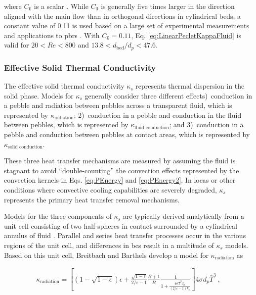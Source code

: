 \noindent where \(C_0\) is a scalar \cite{yagi1957, schertz, tsotsas, yagi,amiri,amiri1995,delgado}. While \(C_0\) is generally five times larger in the direction aligned with the main flow than in orthogonal directions in cylindrical beds, a constant value of 0.11 is used based on a large set of experimental measurements and applications to \glspl{pbr} \cite{yagi1957,auwerda_2011,delgado,amiri1995,yagi,tsotsas}. With \(C_0=0.11\), Eq. \eqref{eq:LinearPecletKappaFluid} is valid for \(20<Re<800\) and \(13.8<d_\text{bed}/d_p<47.6\).

\subsubsection{Effective Solid Thermal Conductivity}
\label{sec:KappaS}

The effective solid thermal conductivity \(\kappa_s\) represents thermal dispersion in the solid phase. Models for \(\kappa_s\) generally consider three different effects)~conduction in a pebble and radiation between pebbles across a transparent fluid, which is represented by \(\kappa_\text{radiation}\); 2)~conduction in a pebble and conduction in the fluid between pebbles, which is represented by \(\kappa_\textrm{fluid conduction}\); and 3)~conduction in a pebble and conduction between pebbles at contact areas, which is represented by \(\kappa_\textrm{solid conduction}\).

These three heat transfer mechanisms are measured by assuming the fluid is stagnant to avoid ``double-counting'' the convection effects represented by the convection kernels in Eqs. \eqref{eq:PEnergy} and \eqref{eq:PEnergy2}. In \glspl{loca} or other conditions where convective cooling capabilities are severely degraded, \(\kappa_s\) represents the primary heat transfer removal mechanisms. 

Models for the three components of \(\kappa_s\) are typically derived analytically from a unit cell consisting of two half-spheres in contact surrounded by a cylindrical annulus of fluid \cite{breitbach}. Parallel and series heat transfer processes occur in the various regions of the unit cell, and differences in \glspl{bc} result in a multitude of \(\kappa_s\) models. Based on this unit cell, Breitbach and Barthels develop a model for \(\kappa_\text{radiation}\) as

\begin{equation}
\begin{aligned}
\label{eq:KappaRadiationBB}
\kappa_\text{radiation}=\left\lbrack\left(1-\sqrt{1-\epsilon}\right)\epsilon+\frac{\sqrt{1-\epsilon}}{2/\varepsilon-1}\frac{B+1}{B}\frac{1}{1+\frac{4\sigma\bar{T}^3d_p}{(2/\varepsilon-1)k_s}}\right\rbrack4\sigma d_p\bar{T}^{3}\ ,
\end{aligned}
\end{equation}

